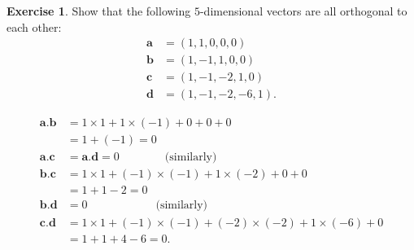 \documentclass[a4paper]{book}
\newcommand{\tm}        {\times}
\newcommand{\VEC}[1]    {\mathbf{#1}}
\renewcommand{\:}{\colon}
\theoremstyle{definition}
\newtheorem{exercise}[theorem]{Exercise}
\renewenvironment{solution}{\SolutionInline}{\endSolutionInline}
\begin{document}
\begin{exercise}
 Show that the following $5$-dimensional vectors are all orthogonal to
 each other:
 \begin{align*}
  \VEC{a} &= (1,1,0,0,0) \\
  \VEC{b} &= (1,-1,1,0,0) \\
  \VEC{c} &= (1,-1,-2,1,0) \\
  \VEC{d} &= (1,-1,-2,-6,1).
 \end{align*}
\end{exercise}
\begin{solution}
 \begin{align*}
  \VEC{a}.\VEC{b} &= 1\tm 1 + 1 \tm (-1) + 0 + 0 + 0 \\
                  &= 1 + (-1) = 0 \\
  \VEC{a}.\VEC{c} &= \VEC{a}.\VEC{d} = 0 
                     \hspace{4em} \text{(similarly)} \\
  \VEC{b}.\VEC{c} &= 1\tm 1 + (-1)\tm(-1) + 1 \tm (-2) + 0 + 0 \\
                  &= 1 + 1 - 2 = 0 \\
  \VEC{b}.\VEC{d} &= 0 \hspace{6em} \text{(similarly)} \\
  \VEC{c}.\VEC{d} &= 1\tm 1 + (-1)\tm(-1) + (-2) \tm (-2) + 1\tm(-6) + 0 \\
                  &= 1 + 1 + 4 - 6 = 0.
 \end{align*}
\end{solution}
\end{document}

